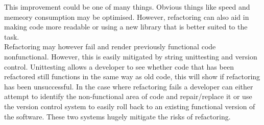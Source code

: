 \documentclass{article}
\begin{document}
This improvement could be one of many things. Obvious things like speed and memeory consumption may be optimised. However, refactoring can also aid in making code more readable or using a new library that is better suited to the task.\\

Refactoring may however fail and render previously functional code nonfunctional. However, this is easily mitigated by string unittesting and version control. Unittesting allows a developer to see whether code that has been refactored still functions in the same way as old code, this will show if refactoring has been unsuccessful. In the case where refactoring fails a developer can either attempt to identify the non-functional area of code and repair/replace it or use the version control system to easily roll back to an existing functional version of the software. These two systems hugely mitigate the risks of refactoring.\\
\end{document}

